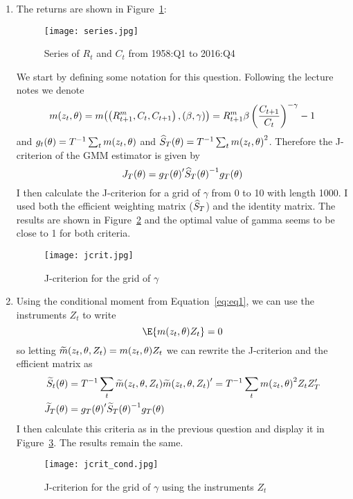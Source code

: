 \begin{solution}
\begin{enumerate}[label = \Alph*)]
    \item The returns are shown in Figure~\ref{fig:series}:
    \begin{figure}
        \centering
        \texttt{[image: series.jpg]}
        \caption{Series of \(R_t\) and \(C_t\) from 1958:Q1 to 2016:Q4}
        \label{fig:series}
    \end{figure}
    We start by defining some notation for this question. Following the lecture notes we denote 
    \[
        m{\left( z_t, \theta \right)} = m{\left( \left( R_{t+1}^m, C_t, C_{t+1} \right), \left( \beta, \gamma \right) \right)} = R^m_{t+1}\beta\left( \frac{C_{t+1}}{C_t} \right)^{-\gamma}-1
    \]
    and \(g_t{\left( \theta \right)} = T^{-1}\sum_t m{\left( z_t, \theta \right)}\) and \(\widehat{S}_T{\left( \theta \right)} =T^{-1}\sum_t m{\left( z_t,\theta \right)}^2\). Therefore the J-criterion of the GMM estimator is given by
    \[
        J_T{\left( \theta \right)} = g_T{\left( \theta \right)}^\prime \widehat{S}_T{\left( \theta \right)}^{-1} g_T{\left( \theta \right)}
    \]
    I then calculate the J-criterion for a grid of \(\gamma\) from 0 to 10 with length 1000. I used both the efficient weighting matrix (\(\widehat{S}_T\)) and the identity matrix. The results are shown in Figure~\ref{fig:jcrit} and the optimal value of gamma seems to be close to 1 for both criteria.
    \begin{figure}[H]
        \centering
        \caption{J-criterion for the grid of \(\gamma\)}
        \label{fig:jcrit}
        \texttt{[image: jcrit.jpg]}
    \end{figure}
    \item Using the conditional moment from Equation~\ref{eq:eq1}, we can use the instruments \(Z_t\) to write
    \[
        \E{m(z_t, \theta) Z_t} = 0
    \]
    so letting \(\widetilde{m}{\left( z_t, \theta, Z_t \right)} = m{\left( z_t, \theta \right)} Z_t\) we can rewrite the J-criterion and the efficient matrix as
    \begin{align*}
        \widetilde{S}_t{\left( \theta \right)} & = T^{-1} \sum_t \widetilde{m}{\left( z_t, \theta, Z_t \right)} \widetilde{m}{\left( z_t, \theta, Z_t \right)}^\prime = T^{-1} \sum_t m{\left( z_t, \theta \right)}^2 Z_t Z_T^\prime \\
        \widetilde{J}_T{\left( \theta \right)} & = g_T{\left( \theta \right)}^\prime \widetilde{S}_T{\left( \theta \right)}^{-1} g_T{\left( \theta \right)}
    \end{align*}
    I then calculate this criteria as in the previous question and display it in Figure~\ref{fig:jcrit_cond}. The results remain the same.
    \begin{figure}[H]
        \centering
        \caption{J-criterion for the grid of \(\gamma\) using the instruments \(Z_t\)}
        \label{fig:jcrit_cond}
        \texttt{[image: jcrit\_cond.jpg]}
    \end{figure}


\end{enumerate}
\end{solution}
